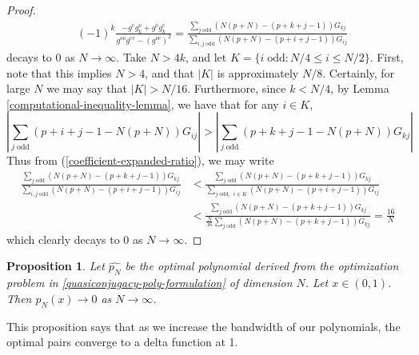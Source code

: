 \documentclass{article}
\newtheorem{prop}[thm]{Proposition}
\theoremstyle{definition}
\theoremstyle{remark}
\numberwithin{equation}{section}
\begin{document}
\begin{proof}
\begin{align}\label{coefficient-expanded-ratio}
&(-1)^k\frac{-g^eg_k^o + g^og_k^e}{g^{oo} g^{ee}-(g^{oe})^2} = \frac{ \sum_{j\; \text{odd}} (N(p+N) -(p+k+j-1))G_{kj}}{ \sum_{i,j \; \text{odd}}  (N(p+N) -(p+i+j-1))G_{ij}}
\end{align}
decays to 0 as $N\to \infty$. Take $N>4k$, and let $K = \{i \; \text{odd}: N/4  \le i \le N/2\}$. First, note that this implies $N>4$, and that $|K|$ is approximately $N/8$. Certainly, for large $N$ we may say that $|K|>N/16$. Furthermore, since $k<N/4$, by Lemma \ref{computational-inequality-lemma}, we have that for any $i\in K$, 
\begin{equation}\label{inequality-sum-of-products} \left|\sum_{j\; \text{odd}} (p+i+j-1 - N(p+N))G_{ij} \right| > \left| \sum_{j\; \text{odd}} (p+k+j-1 - N(p+N))G_{kj} \right|\end{equation}
Thus from (\ref{coefficient-expanded-ratio}), we may write
\begin{align*}
\frac{ \sum_{j\; \text{odd}} (N(p+N) -(p+k+j-1))G_{kj}}{ \sum_{i,j \; \text{odd}}  (N(p+N) -(p+i+j-1))G_{ij}} &< \frac{ \sum_{j\; \text{odd}} (N(p+N) -(p+k+j-1))G_{kj}}{ \sum_{j\; \text{odd, }\; i\in K}  (N(p+N) -(p+i+j-1))G_{ij}}\\
& < \frac{ \sum_{j\; \text{odd}} (N(p+N) -(p+k+j-1))G_{kj}}{\frac{N}{16} \sum_{j \; \text{odd}}  (N(p+N) -(p+k+j-1))G_{kj}} = \frac{16}{N}
\end{align*} which clearly decays to 0 as $N\to \infty$.
\end{proof}

\begin{prop}\label{pointwise-convergence-zero-one-function}
Let $\hat{p_N}$ be the optimal polynomial derived from the optimization problem in \ref{quasiconjugacy-poly-formulation} of dimension $N$. Let $x\in (0,1)$. Then $p_N(x) \to 0$ as $N\to \infty$. 
\end{prop}
This proposition says that as we increase the bandwidth of our polynomials, the optimal pairs converge to a delta function at 1.
\end{document}
